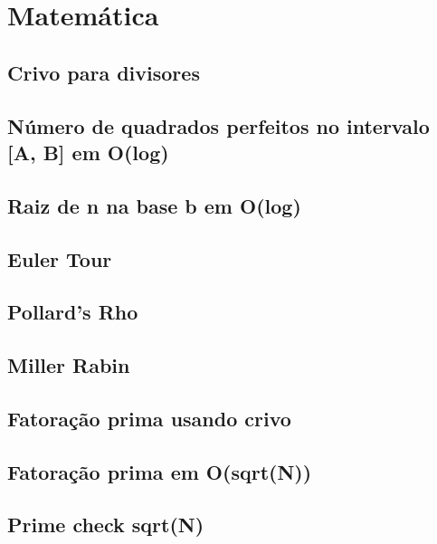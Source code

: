 \section{Matemática}

\subsection{Crivo para divisores}


\subsection{Número de quadrados perfeitos no intervalo [A, B] em O(log)}


\subsection{Raiz de n na base b em O(log)}


\subsection{Euler Tour}


\subsection{Pollard's Rho}


\subsection{Miller Rabin}


\subsection{Fatoração prima usando crivo}


\subsection{Fatoração prima em O(sqrt(N))}


\subsection{Prime check sqrt(N)}


